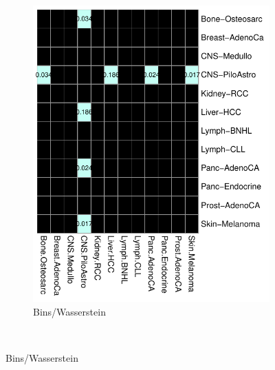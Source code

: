 \begin{figure}[ht!]
\begin{subfigure}{.5\textwidth}
    \includegraphics[scale=0.7]{graphics/bootstrap_bins_wasserstein.pdf}
    \caption{Bins/Wasserstein}
    \label{fig:bootstrap_bins_wasserstein}
    \end{subfigure} \\
    \vspace{0.5cm}
    

\end{figure}
